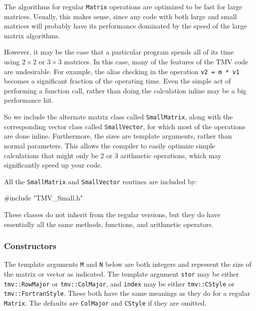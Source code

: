 \documentclass[twoside,letterpaper,11pt]{article}
\renewcommand{\tt}[1]{{\lstinline {#1}}}
\begin{document}
The algorithms for regular \tt{Matrix} operations are optimized to be
fast for large matrices.  Usually, this makes sense, since any code with
both large and small matrices will probably have its performance dominated
by the speed of the large matrix algorithms.

However, it may be the case that a particular program spends all of its
time using $2 \times 2$ or $3 \times 3$ matrices.  In this case, 
many of the features of the TMV code are undesirable.  For example, 
the alias checking in the operation \tt{v2 = m * v1} becomes a significant
fraction of the operating time.  Even the simple act of performing a function
call, rather than doing the calculation inline may be a big performance hit.

So we include the alternate matrix class called \tt{SmallMatrix}, along 
with the corresponding vector class called \tt{SmallVector}, for which most of 
the operations are done inline.  Furthermore, the sizes are template arguments,
rather than normal parameters.  This allows the compiler to easily optimize
simple calculations that might only be 2 or 3 arithmetic operations, which
may significantly speed up your code.

All the \tt{SmallMatrix} and \tt{SmallVector} routines are included by:
\begin{tmvcode}
#include "TMV_Small.h"
\end{tmvcode}

These classes do not inherit from the regular versions, but they do have 
essentially all the same methods, functions, and arithmetic operators. 

\subsubsection{Constructors}
\label{SmallMatrix_Constructors}

The template arguments \tt{M} and \tt{N} below are both integers and
represent the size of the matrix or vector as indicated.
The template argument \tt{stor} may be either \tt{tmv::RowMajor} or
\tt{tmv::ColMajor}, and
 \tt{index} may be either \tt{tmv::CStyle} or
\tt{tmv::FortranStyle}.  These both have the same meanings as they do 
for a regular \tt{Matrix}. The defaults are \tt{ColMajor} and \tt{CStyle} if they
are omitted.
\end{document}
